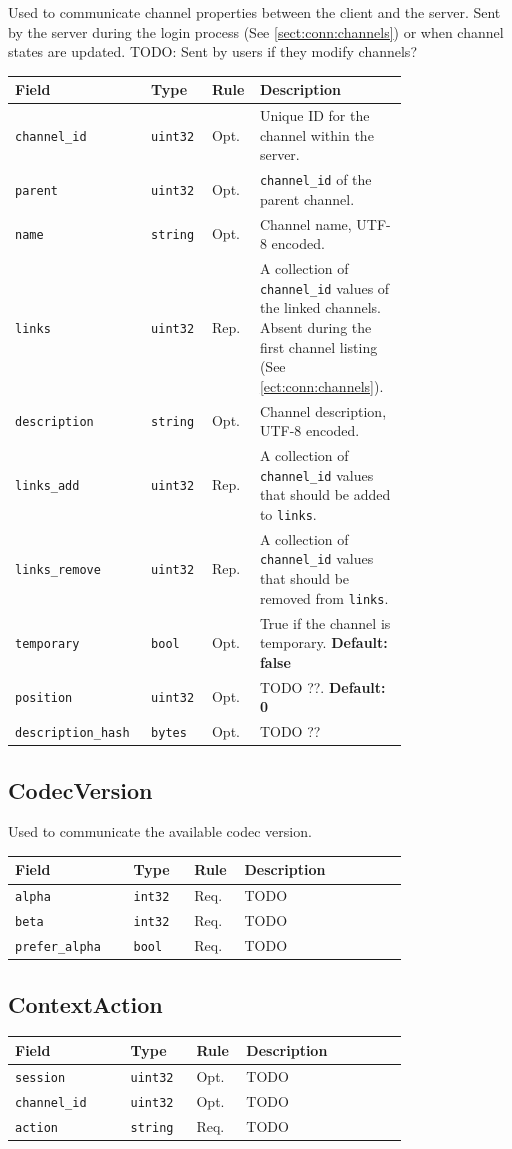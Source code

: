 \documentclass[11pt]{article} %
\newenvironment{mumbleMessageEx}
{%
	\small
	\renewcommand\arraystretch{1.5}
	\begin{tabular}{p{0.25\linewidth}p{0.13\linewidth}p{0.05\linewidth}p{0.35\linewidth}}
	Field & Type & Rule & Description \\
	\hline
}
{%
	\end{tabular}
	\renewcommand\arraystretch{1.0}
}
\newcommand{\mumbleMessageExItem}[4]{ \texttt{#1} & \texttt{#2} & #3 & #4 \\ }
\begin{document}
Used to communicate channel properties between the client and the server. Sent by the server during the login process (See \ref{sect:conn:channels}) or when channel states are updated. TODO: Sent by users if they modify channels?

\begin{mumbleMessageEx}
\mumbleMessageExItem{channel\_id}{uint32}{Opt.}{Unique ID for the channel within the server.}
\mumbleMessageExItem{parent}{uint32}{Opt.}{\texttt{channel\_id} of the parent channel.}
\mumbleMessageExItem{name}{string}{Opt.}{Channel name, UTF-8 encoded.}
\mumbleMessageExItem{links}{uint32}{Rep.}{A collection of \texttt{channel\_id} values of the linked channels. Absent during the first channel listing (See \ref{ect:conn:channels}).}
\mumbleMessageExItem{description}{string}{Opt.}{Channel description, UTF-8 encoded.}
\mumbleMessageExItem{links\_add}{uint32}{Rep.}{A collection of \texttt{channel\_id} values that should be added to \texttt{links}.}
\mumbleMessageExItem{links\_remove}{uint32}{Rep.}{A collection of \texttt{channel\_id} values that should be removed from \texttt{links}.}
\mumbleMessageExItem{temporary}{bool}{Opt.}{True if the channel is temporary. \textbf{Default: false}}
\mumbleMessageExItem{position}{uint32}{Opt.}{TODO ??. \textbf{Default: 0}}
\mumbleMessageExItem{description\_hash}{bytes}{Opt.}{TODO ??}
\end{mumbleMessageEx}

\subsection{CodecVersion}

Used to communicate the available codec version.

\begin{mumbleMessageEx}
\mumbleMessageExItem{alpha}{int32}{Req.}{TODO}
\mumbleMessageExItem{beta}{int32}{Req.}{TODO}
\mumbleMessageExItem{prefer\_alpha}{bool}{Req.}{TODO}
\end{mumbleMessageEx}

\subsection{ContextAction}

\begin{mumbleMessageEx}
\mumbleMessageExItem{session}{uint32}{Opt.}{TODO}
\mumbleMessageExItem{channel\_id}{uint32}{Opt.}{TODO}
\mumbleMessageExItem{action}{string}{Req.}{TODO}
\end{mumbleMessageEx}
\end{document}
